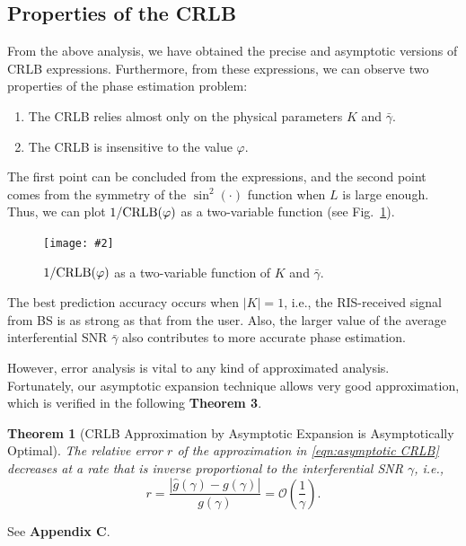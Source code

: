 \documentclass[12pt,draftclsnofoot,journal,onecolumn]{IEEEtran}
\newtheorem{theorem}{\bf Theorem}
\theoremstyle{nonumberplain}
\newcommand{\myincludegraphics}[2][width=12cm]{\texttt{[image: \#2]}}
\begin{document}
\subsection{Properties of the CRLB}
    From the above analysis, we have obtained the precise and asymptotic versions of CRLB expressions. Furthermore, from these expressions, we can observe two properties of the phase estimation problem:
    \begin{enumerate}
        \item The CRLB relies almost only on the physical parameters $K$ and $\bar{\gamma}$.
        \item The CRLB is insensitive to the value $\varphi$.
    \end{enumerate}
    The first point can be concluded from the expressions, and the second point comes from the symmetry of the $\sin^2(\cdot)$ function when $L$ is large enough. Thus, we can plot $1/{\rm CRLB}(\varphi)$ as a two-variable function (see Fig.~\ref{fig:CRLB two variable}). 
    \begin{figure}[!t]
        \centering
        \myincludegraphics{figures/crlb.pdf}
        \caption{$1/{\rm CRLB}(\varphi)$ as a two-variable function of $K$ and $\bar{\gamma}$.}
        \label{fig:CRLB two variable}
    \end{figure}
    The best prediction accuracy occurs when $\lvert K \rvert = 1$, i.e., the RIS-received signal from BS is as strong as that from the user. 
    Also, the larger value of the average interferential SNR $\bar{\gamma}$ also contributes to more accurate phase estimation. 

    However, error analysis is vital to any kind of approximated analysis. Fortunately, our asymptotic expansion technique allows very good approximation, which is verified in the following {\bf Theorem 3}. 

    \begin{theorem}[CRLB Approximation by Asymptotic Expansion is Asymptotically Optimal]
        The relative error $r$ of the approximation in \eqref{eqn:asymptotic CRLB} decreases at a rate that is inverse proportional to the interferential SNR $\gamma$, i.e.,
        \begin{equation}
            r=\frac{\left|\hat{g}(\gamma)-g(\gamma)\right|}{g(\gamma)} = \mathcal{O}\left(\frac{1}{\gamma}\right).
        \end{equation}
    \end{theorem}
    \begin{IEEEproof}
        See {\bf Appendix C}. 
    \end{IEEEproof}
\end{document}
